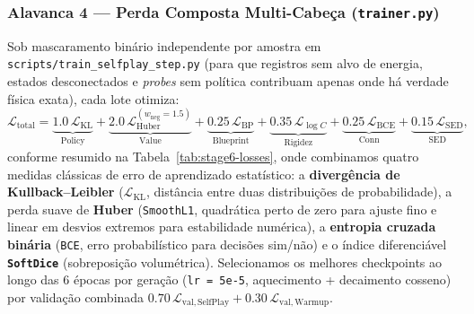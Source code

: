 \documentclass[11pt,a4paper]{article}
\begin{document}
\subsubsection{Alavanca 4 — Perda Composta Multi-Cabeça (\texttt{trainer.py})}
Sob mascaramento binário independente por amostra em \texttt{scripts/train\_selfplay\_step.py} (para que registros sem alvo de energia, estados desconectados e \emph{probes} sem política contribuam apenas onde há verdade física exata), cada lote otimiza:
\begin{equation}
\mathcal{L}_{\mathrm{total}} =
\underbrace{1.0\,\mathcal{L}_{\mathrm{KL}}}_{\mathrm{Policy}}
+ \underbrace{2.0\,\mathcal{L}_{\mathrm{Huber}}^{(w_{\mathrm{neg}}=1.5)}}_{\mathrm{Value}}
+ \underbrace{0.25\,\mathcal{L}_{\mathrm{BP}}}_{\mathrm{Blueprint}}
+ \underbrace{0.35\,\mathcal{L}_{\log C}}_{\mathrm{Rigidez}}
+ \underbrace{0.25\,\mathcal{L}_{\mathrm{BCE}}}_{\mathrm{Conn}}
+ \underbrace{0.15\,\mathcal{L}_{\mathrm{SED}}}_{\mathrm{SED}},
\end{equation}
conforme resumido na Tabela~\ref{tab:stage6-losses}, onde combinamos quatro medidas clássicas de erro de aprendizado estatístico: a \textbf{divergência de Kullback--Leibler} ($\mathcal{L}_{\mathrm{KL}}$, distância entre duas distribuições de probabilidade), a perda suave de \textbf{Huber} (\texttt{SmoothL1}, quadrática perto de zero para ajuste fino e linear em desvios extremos para estabilidade numérica), a \textbf{entropia cruzada binária} (\texttt{BCE}, erro probabilístico para decisões sim/não) e o índice diferenciável \textbf{\texttt{SoftDice}} (sobreposição volumétrica). Selecionamos os melhores checkpoints ao longo das $6$ épocas por geração (\texttt{lr = 5e-5}, aquecimento + decaimento cosseno) por validação combinada $0.70\,\mathcal{L}_{\mathrm{val,SelfPlay}} + 0.30\,\mathcal{L}_{\mathrm{val,Warmup}}$.
\end{document}
